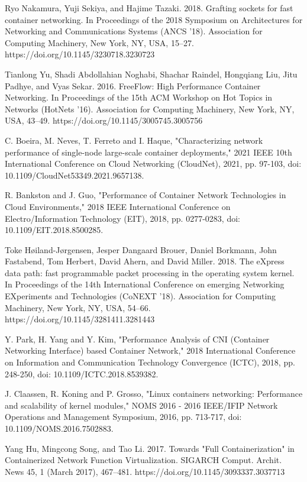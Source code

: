 \documentclass[conference]{IEEEtran}
\begin{document}
\begin{thebibliography}{1}
Ryo Nakamura, Yuji Sekiya, and Hajime Tazaki. 2018. Grafting sockets for fast container networking. In Proceedings of the 2018 Symposium on Architectures for Networking and Communications Systems (ANCS '18). Association for Computing Machinery, New York, NY, USA, 15–27. https://doi.org/10.1145/3230718.3230723

Tianlong Yu, Shadi Abdollahian Noghabi, Shachar Raindel, Hongqiang Liu, Jitu Padhye, and Vyas Sekar. 2016. FreeFlow: High Performance Container Networking. In Proceedings of the 15th ACM Workshop on Hot Topics in Networks (HotNets '16). Association for Computing Machinery, New York, NY, USA, 43–49. https://doi.org/10.1145/3005745.3005756

C. Boeira, M. Neves, T. Ferreto and I. Haque, "Characterizing network performance of single-node large-scale container deployments," 2021 IEEE 10th International Conference on Cloud Networking (CloudNet), 2021, pp. 97-103, doi: 10.1109/CloudNet53349.2021.9657138.

R. Bankston and J. Guo, "Performance of Container Network Technologies in Cloud Environments," 2018 IEEE International Conference on Electro/Information Technology (EIT), 2018, pp. 0277-0283, doi: 10.1109/EIT.2018.8500285.

Toke Høiland-Jørgensen, Jesper Dangaard Brouer, Daniel Borkmann, John Fastabend, Tom Herbert, David Ahern, and David Miller. 2018. The eXpress data path: fast programmable packet processing in the operating system kernel. In Proceedings of the 14th International Conference on emerging Networking EXperiments and Technologies (CoNEXT '18). Association for Computing Machinery, New York, NY, USA, 54–66. https://doi.org/10.1145/3281411.3281443

Y. Park, H. Yang and Y. Kim, "Performance Analysis of CNI (Container Networking Interface) based Container Network," 2018 International Conference on Information and Communication Technology Convergence (ICTC), 2018, pp. 248-250, doi: 10.1109/ICTC.2018.8539382.

J. Claassen, R. Koning and P. Grosso, "Linux containers networking: Performance and scalability of kernel modules," NOMS 2016 - 2016 IEEE/IFIP Network Operations and Management Symposium, 2016, pp. 713-717, doi: 10.1109/NOMS.2016.7502883.

Yang Hu, Mingcong Song, and Tao Li. 2017. Towards "Full Containerization" in Containerized Network Function Virtualization. SIGARCH Comput. Archit. News 45, 1 (March 2017), 467–481. https://doi.org/10.1145/3093337.3037713


\end{thebibliography}
\end{document}
